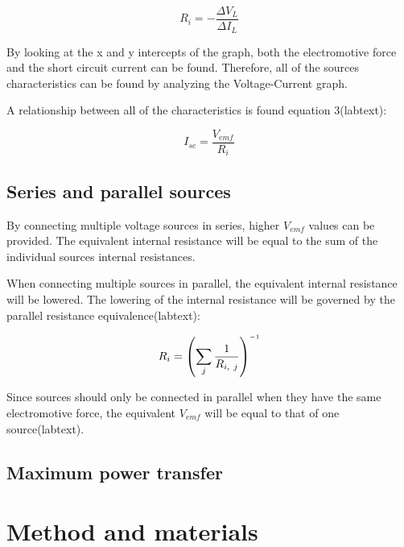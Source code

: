\documentclass[a4paper]{article}
\newcommand{\inv}{^{\raisebox{.2ex}{$\scriptscriptstyle-1$}}}
\begin{document}
\begin{equation}
    R_i = -\frac{\Delta V_L}{\Delta I_L}
\end{equation}

By looking at the x and y intercepts of the graph, both the electromotive force
and the short circuit current can be found. Therefore, all of the sources
characteristics can be found by analyzing the Voltage-Current graph.

A relationship between all of the characteristics is found equation 3(labtext):

\begin{equation}
    I_{sc} = \frac{V_{emf}}{R_i}
\end{equation}

\subsection{Series and parallel sources}
By connecting multiple voltage sources in series, higher $V_{emf}$ values can be
provided. The equivalent internal resistance will be equal to the sum of the
individual sources internal resistances.

When connecting multiple sources in parallel, the equivalent internal resistance
will be lowered. The lowering of the internal resistance will be governed by the
parallel resistance equivalence(labtext):

\begin{equation}
    R_i = \left( \sum_{j} \frac{1}{R_{i,~j}}\right) \inv
\end{equation}

Since sources should only be connected in parallel when they have the same
electromotive force, the equivalent $V_{emf}$ will be equal to that of one
source(labtext).

\subsection{Maximum power transfer}

\section{Method and materials}
\end{document}
